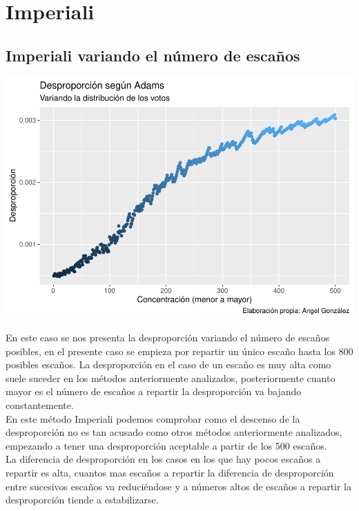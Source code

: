 \documentclass[12pt,a4paper,]{book}
\numberwithin{dummy}{section}
\theoremstyle{ocrenumbox}
\theoremstyle{blacknumex}
\theoremstyle{blacknumbox}
\theoremstyle{ocrenum}
\theoremstyle{ocrenum}
\begin{document}
\hypertarget{imperiali}{%
\section{Imperiali}\label{imperiali}}

\hypertarget{imperiali-variando-el-nuxfamero-de-escauxf1os}{%
\subsection{Imperiali variando el número de
escaños}\label{imperiali-variando-el-nuxfamero-de-escauxf1os}}

\begin{center}\includegraphics[width=0.95\linewidth]{figurasR/unnamed-chunk-33-1} \end{center}

En este caso se nos presenta la desproporción variando el número de
escaños posibles, en el presente caso se empieza por repartir un único
escaño hasta los 800 posibles escaños. La desproporción en el caso de un
escaño es muy alta como suele suceder en los métodos anteriormente
analizados, posteriormente cuanto mayor es el número de escaños a
repartir la desproporción va bajando constantemente.\\
En este método Imperiali podemos comprobar como el descenso de la
desproporción no es tan acusado como otros métodos anteriormente
analizados, empezando a tener una desproporción aceptable a partir de
los 500 escaños.\\
La diferencia de desproporción en los casos en los que hay pocos escaños
a repartir es alta, cuantos mas escaños a repartir la diferencia de
desproporción entre sucesivos escaños va reduciéndose y a números altos
de escaños a repartir la desproporción tiende a estabilizarse.
\end{document}

